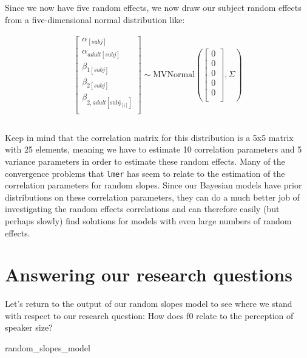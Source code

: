 \documentclass[
]{book}
\newenvironment{Shaded}{\begin{snugshade}}{\end{snugshade}}
\newcommand{\NormalTok}[1]{#1}
\begin{document}
Since we now have five random effects, we now draw our subject random effects from a five-dimensional normal distribution like:

\begin{equation}
\begin{split}
\begin{bmatrix} \alpha_{[subj]} \\ \alpha_{adult[subj]} \\ \beta_{1[subj]} \\ \beta_{2[subj]} \\ \beta_{2,adult[\mathrm{subj}_{[i]}]} \\ \end{bmatrix}  
\sim \mathrm{MVNormal} ( \begin{bmatrix} 0 \\ 0 \\ 0 \\ 0 \\ 0 \\ \end{bmatrix}, \Sigma) \\ \\
\end{split}
\label{eq:616b}
\end{equation}

Keep in mind that the correlation matrix for this distribution is a 5x5 matrix with 25 elements, meaning we have to estimate 10 correlation parameters and 5 variance parameters in order to estimate these random effects. Many of the convergence problems that \texttt{lmer} has seem to relate to the estimation of the correlation parameters for random slopes. Since our Bayesian models have prior distributions on these correlation parameters, they can do a much better job of investigating the random effects correlations and can therefore easily (but perhaps slowly) find solutions for models with even large numbers of random effects.

\hypertarget{answering-our-research-questions-1}{%
\section{Answering our research questions}\label{answering-our-research-questions-1}}

Let's return to the output of our random slopes model to see where we stand with respect to our research question: How does f0 relate to the perception of speaker size?

\begin{Shaded}
\begin{Highlighting}[]
\NormalTok{random\_slopes\_model}
\end{Highlighting}
\end{Shaded}
\end{document}
